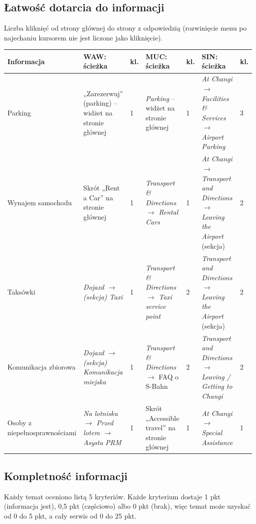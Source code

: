 \documentclass[11pt,a4paper]{article}
\begin{document}
\subsection{Łatwość dotarcia do informacji}
\label{sec:klikniecia}

Liczba kliknięć od strony głównej do strony z odpowiedzią (rozwinięcie menu po najechaniu kursorem nie jest liczone jako kliknięcie).

{\footnotesize
\begin{tabularx}{\textwidth}{@{}L{2cm}YC{0.6cm}YC{0.6cm}YC{0.6cm}@{}}
\toprule
Informacja & WAW: ścieżka & kl. & MUC: ścieżka & kl. & SIN: ścieżka & kl. \\
\midrule
Parking & „Zarezerwuj” (parking) -- widżet na stronie głównej & 1 & \textit{Parking} -- widżet na stronie głównej & 1 & \textit{At Changi $\rightarrow$ Facilities \& Services $\rightarrow$ Airport Parking} & 3 \\
Wynajem samochodu & Skrót „Rent a Car” na stronie głównej & 1 & \textit{Transport \& Directions $\rightarrow$ Rental Cars} & 1 & \textit{At Changi $\rightarrow$ Transport and Directions $\rightarrow$ Leaving the Airport} (sekcja) & 2 \\
Taksówki & \textit{Dojazd $\rightarrow$ (sekcja) Taxi} & 1 & \textit{Transport \& Directions $\rightarrow$ Taxi service point} & 2 & \textit{Transport and Directions $\rightarrow$ Leaving the Airport} (sekcja) & 2 \\
Komunikacja zbiorowa & \textit{Dojazd $\rightarrow$ (sekcja) Komunikacja miejska} & 1 & \textit{Transport \& Directions} $\rightarrow$ FAQ o S-Bahn & 2 & \textit{Transport and Directions $\rightarrow$ Leaving / Getting to Changi} & 2 \\
Osoby z niepełno\-sprawnościami & \textit{Na lotnisku $\rightarrow$ Przed lotem $\rightarrow$ Asysta PRM} & 1 & Skrót „Accessible travel” na stronie głównej & 1 & \textit{At Changi $\rightarrow$ Special Assistance} & 1 \\
\bottomrule
\end{tabularx}
}

\subsection{Kompletność informacji}
\label{sec:kompletnosc}

Każdy temat oceniono listą 5 kryteriów. Każde kryterium dostaje 1 pkt (informacja jest), 0,5 pkt (częściowo) albo 0 pkt (brak), więc temat może uzyskać od 0 do 5 pkt, a cały serwis od 0 do 25 pkt.
\end{document}
